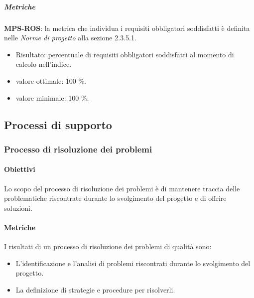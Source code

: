 \documentclass[../piano-di-qualifica.tex]{subfiles}
\begin{document}
\subparagraph{Metriche}%
\label{par:metriche}

\textbf{MPS-ROS}: la metrica che individua i requisiti obbligatori soddisfatti è definita nelle \textit{Norme di progetto} alla sezione 2.3.5.1.
\begin{itemize}
  \item Risultato: percentuale di requisiti obbligatori soddisfatti al momento di calcolo nell'indice.
  \item valore ottimale: 100 \%.
  \item valore minimale: 100 \%.
\end{itemize}

\subsection{Processi di supporto}%
\label{sub:processi_di_supporto}


\subsubsection{Processo di risoluzione dei problemi}%
\label{subs:processo_di_risoluzione_dei_problemi}

\paragraph{Obiettivi}%
\label{par:obiettivi_prob}

Lo scopo del processo di risoluzione dei problemi è di mantenere traccia delle problematiche riscontrate durante lo svolgimento del progetto e di offrire soluzioni.


\paragraph{Metriche}%
\label{par:metriche_prob}

I risultati di un processo di risoluzione dei problemi di qualità sono:
\begin{itemize}

  \item L'identificazione e l'analisi di problemi riscontrati durante lo svolgimento del progetto.
  \item La definizione di strategie e procedure per risolverli.
\end{itemize}
\end{document}
